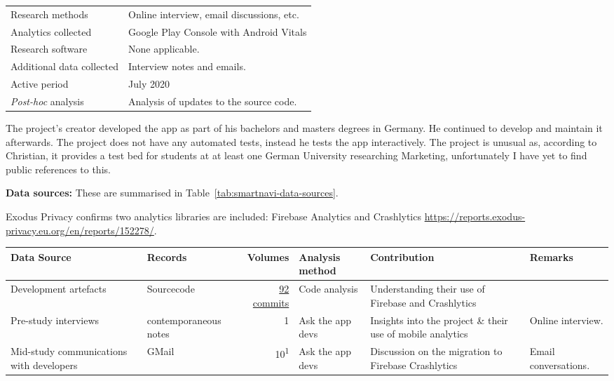 {\begin{table*}[h]
\begin{tabular}{lp{9cm}}
       \midrule
       Research methods &Online interview, email discussions, etc. \\
       Analytics collected &Google Play Console with Android Vitals \\
       Research software & None applicable. \\
       Additional data collected &Interview notes and emails. \\
       Active period & July 2020 \\
       \midrule
       \emph{Post-hoc} analysis &Analysis of updates to the source code. \\
       \bottomrule
    \end{tabular}
    \caption{Case Study key facts: SmartNavi}
    \label{tab:smartnavi_anaytics_overview}
\end{table*}
}

The project's creator developed the app as part of his bachelors and masters degrees in Germany. He continued to develop and maintain it afterwards. The project does not have any automated tests, instead he tests the app interactively.  The project is unusual as, according to Christian, it provides a test bed for students at at least one German University researching Marketing, unfortunately I have yet to find public references to this.

\textbf{Data sources: } These are summarised in Table~\ref{tab:smartnavi-data-sources}.

Exodus Privacy confirms two analytics libraries are included: Firebase Analytics and Crashlytics \url{https://reports.exodus-privacy.eu.org/en/reports/152278/}.%


\begin{table*}
    \centering
    \footnotesize
    \tabcolsep=0.12cm
    \begin{tabular}{>{\raggedright}p{3cm}p{2.4cm}r>{\raggedright}p{2.1cm}>{\raggedright\arraybackslash}p{3cm}>{\raggedright\arraybackslash}p{2.2cm}}
        Data Source & Records & Volumes & Analysis method & Contribution & Remarks \\
        \toprule
        Development artefacts & Sourcecode\footnotemark & \href{https://github.com/Phantast/smartnavi/commits/master}{92 commits} & Code analysis & Understanding their use of Firebase and Crashlytics & \\
        Pre-study interviews & contemporaneous notes & 1 & Ask the app devs & Insights into the project \& their use of mobile analytics & Online interview. \\
        Mid-study communications with developers & GMail & 10\textsuperscript{1} & Ask the app devs & Discussion on the migration to Firebase Crashlytics & Email conversations. \\
         \bottomrule
    \end{tabular}
    \caption{SmartNavi: data sources}
    \label{tab:smartnavi-data-sources}
\end{table*}


